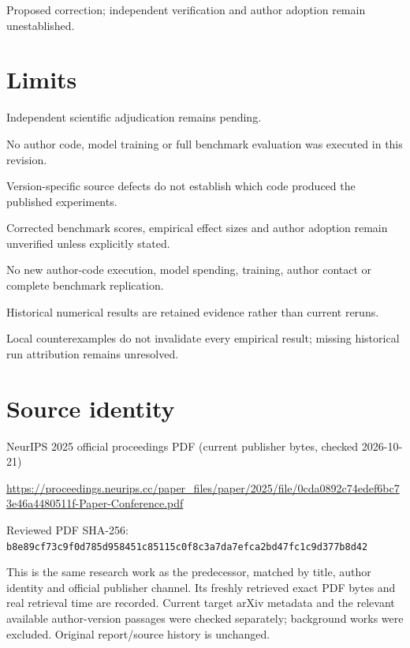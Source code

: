 \documentclass[11pt]{article}
\begin{document}
Proposed correction; independent verification and author adoption remain unestablished.

\section*{Limits}

Independent scientific adjudication remains pending.\par

No author code, model training or full benchmark evaluation was executed in this revision.\par

Version-specific source defects do not establish which code produced the published experiments.\par

Corrected benchmark scores, empirical effect sizes and author adoption remain unverified unless explicitly stated.\par

No new author-code execution, model spending, training, author contact or complete benchmark replication.\par

Historical numerical results are retained evidence rather than current reruns.\par

Local counterexamples do not invalidate every empirical result; missing historical run attribution remains unresolved.\par

\section*{Source identity}

NeurIPS 2025 official proceedings PDF (current publisher bytes, checked 2026-10-21)

\url{https://proceedings.neurips.cc/paper_files/paper/2025/file/0cda0892c74edef6bc73e46a4480511f-Paper-Conference.pdf}

Reviewed PDF SHA-256: \nolinkurl{b8e89cf73c9f0d785d958451c85115c0f8c3a7da7efca2bd47fc1c9d377b8d42}

This is the same research work as the predecessor, matched by title, author identity and official publisher channel. Its freshly retrieved exact PDF bytes and real retrieval time are recorded. Current target arXiv metadata and the relevant available author-version passages were checked separately; background works were excluded. Original report/source history is unchanged.
\end{document}
